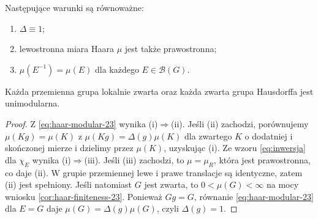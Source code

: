 \begin{wniosek}
\label{it:cor:haar-unimodular}
Następujące warunki są równoważne:
\begin{enumerate}[label=(\roman*)]
\item $\Delta\equiv1$;
\item lewostronna miara Haara $\mu$ jest także prawostronna;
\item $\mu(E^{-1})=\mu(E)$ dla każdego $E\in\mathcal B(G)$.
\end{enumerate}
Każda przemienna grupa lokalnie zwarta oraz każda
zwarta grupa Hausdorffa jest unimodularna.
\end{wniosek}
\begin{proof}
Z \eqref{eq:haar-modular-23} wynika (i)$\Rightarrow$(ii).
Jeśli (ii) zachodzi, porównujemy $\mu(Kg)=\mu(K)$
z $\mu(Kg)=\Delta(g)\mu(K)$ dla zwartego $K$
o dodatniej i skończonej mierze i dzielimy przez
$\mu(K)$, uzyskując (i).
Ze wzoru \eqref{eq:inwersja} dla $\chi_E$
wynika (i)$\Rightarrow$(iii).
Jeśli (iii) zachodzi, to $\mu=\mu_R$, która
jest prawostronna, co daje (ii).
W grupie przemiennej lewe i prawe translacje są
identyczne, zatem (ii) jest spełniony.
Jeśli natomiast $G$ jest zwarta, to
$0<\mu(G)<\infty$ na mocy wniosku
\ref{cor:haar-finiteness-23}. Ponieważ $Gg=G$,
równanie \eqref{eq:haar-modular-23} dla $E=G$
daje $\mu(G)=\Delta(g)\mu(G)$, czyli $\Delta(g)=1$.
\end{proof}

